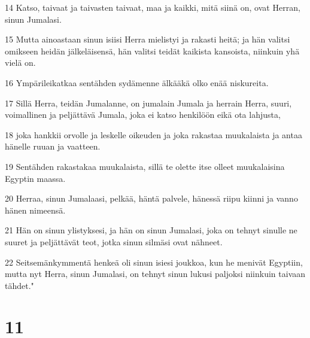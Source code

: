 \par 14 Katso, taivaat ja taivasten taivaat, maa ja kaikki, mitä siinä on, ovat Herran, sinun Jumalasi.
\par 15 Mutta ainoastaan sinun isiisi Herra mielistyi ja rakasti heitä; ja hän valitsi omikseen heidän jälkeläisensä, hän valitsi teidät kaikista kansoista, niinkuin yhä vielä on.
\par 16 Ympärileikatkaa sentähden sydämenne älkääkä olko enää niskureita.
\par 17 Sillä Herra, teidän Jumalanne, on jumalain Jumala ja herrain Herra, suuri, voimallinen ja peljättävä Jumala, joka ei katso henkilöön eikä ota lahjusta,
\par 18 joka hankkii orvolle ja leskelle oikeuden ja joka rakastaa muukalaista ja antaa hänelle ruuan ja vaatteen.
\par 19 Sentähden rakastakaa muukalaista, sillä te olette itse olleet muukalaisina Egyptin maassa.
\par 20 Herraa, sinun Jumalaasi, pelkää, häntä palvele, hänessä riipu kiinni ja vanno hänen nimeensä.
\par 21 Hän on sinun ylistyksesi, ja hän on sinun Jumalasi, joka on tehnyt sinulle ne suuret ja peljättävät teot, jotka sinun silmäsi ovat nähneet.
\par 22 Seitsemänkymmentä henkeä oli sinun isiesi joukkoa, kun he menivät Egyptiin, mutta nyt Herra, sinun Jumalasi, on tehnyt sinun lukusi paljoksi niinkuin taivaan tähdet."

\chapter{11}

